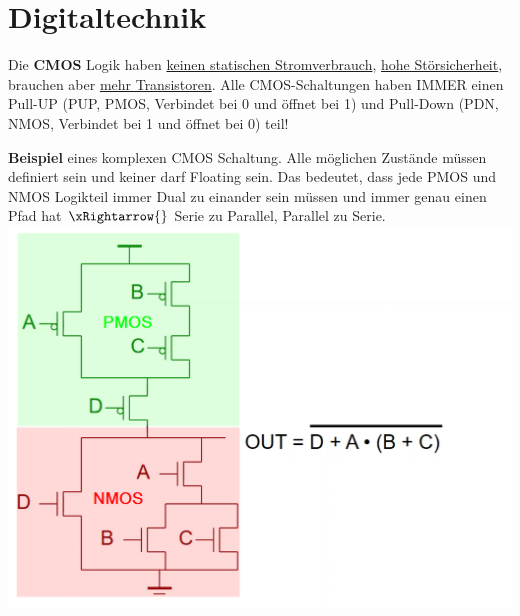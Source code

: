\section{Digitaltechnik}
Die \textbf{CMOS} Logik haben \underline{keinen statischen Stromverbrauch}, \underline{hohe Störsicherheit}, brauchen aber \underline{mehr Transistoren}. Alle CMOS-Schaltungen haben IMMER einen Pull-UP (PUP, PMOS, Verbindet bei 0 und öffnet bei 1) und Pull-Down (PDN, NMOS, Verbindet bei 1 und öffnet bei 0) teil!

\noindent\textbf{Beispiel} eines komplexen CMOS Schaltung. Alle möglichen Zustände müssen definiert sein und keiner darf Floating sein. Das bedeutet, dass jede PMOS und NMOS Logikteil immer Dual zu einander sein müssen und immer genau einen Pfad hat $\xRightarrow{}$ Serie zu Parallel, Parallel zu Serie.
\includegraphics[width=\columnwidth]{Images/cmos}
